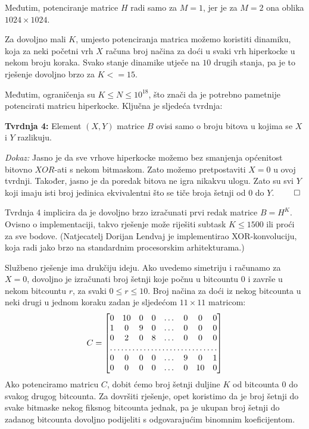 Međutim, potenciranje matrice $H$ radi samo za $M=1$, jer
je za $M=2$ ona oblika $1024 \times 1024$.

Za dovoljno mali $K$, umjesto potenciranja matrica možemo koristiti
dinamiku, koja za neki početni vrh $X$ računa broj načina
za doći u svaki vrh hiperkocke u nekom broju koraka. Svako
stanje dinamike utječe na $10$ drugih stanja, pa je
to rješenje dovoljno brzo za $K <= 15$.

Međutim, ograničenja su $K \le N \le 10^{18}$, što znači
da je potrebno pametnije potencirati matricu hiperkocke.
Ključna je sljedeća tvrdnja:

\textbf{Tvrdnja 4:} Element $(X, Y)$ matrice $B$ ovisi samo o broju
bitova u kojima se $X$ i $Y$ razlikuju.

\textit{Dokaz:} Jasno je da sve vrhove hiperkocke možemo
bez smanjenja općenitost bitovno $XOR$-ati s nekom bitmaskom.
Zato možemo pretpostaviti $X=0$ u ovoj tvrdnji.
Također, jasno je da poredak bitova ne igra nikakvu ulogu.
Zato su svi $Y$ koji imaju isti broj jedinica ekvivalentni
što se tiče broja šetnji od $0$ do $Y$. $\qed$


Tvrdnja 4 implicira da je dovoljno brzo izračunati prvi redak matrice $B = H^K$.
Ovisno o implementaciji, takvo rješenje može
riješiti subtask $K \le 1500$ ili proći za sve bodove.
(Natjecatelj Dorijan Lendvaj je implementirao XOR-konvoluciju,
koja radi jako brzo na standardnim procesorskim arhitekturama.)

Službeno rješenje ima drukčiju ideju.
Ako uvedemo simetriju i računamo za $X=0$, dovoljno je izračunati
broj šetnji koje počnu u bitcountu $0$ i završe u nekom bitcountu $r$, za svaki
$0 \le r \le 10$.
Broj načina za doći iz nekog bitcounta u neki drugi u jednom koraku
zadan je sljedećom $11 \times 11$ matricom:
\[
  C =
\begin{bmatrix}
  0       & 10 & 0 & 0 & \dots  & 0 & 0 & 0 \\
    1       & 0 & 9 & 0 & \dots & 0 & 0 & 0 \\
    0       & 2 & 0 & 8 & \dots & 0 & 0 & 0 \\
    \hdotsfor{8} \\
    0       & 0 & 0 & 0 & \dots & 9 & 0 & 1 \\
    0       & 0 & 0 & 0 & \dots & 0 & 10 & 0 \\
\end{bmatrix}
\]
Ako potenciramo matricu $C$, dobit ćemo broj šetnji duljine $K$ od bitcounta $0$
do svakog drugog bitcounta.
Za dovršiti rješenje, opet koristimo da je broj šetnji do svake
bitmaske nekog fiksnog bitcounta jednak, pa je ukupan broj
šetnji do zadanog bitcounta dovoljno podijeliti s
odgovarajućim binomnim koeficijentom.

